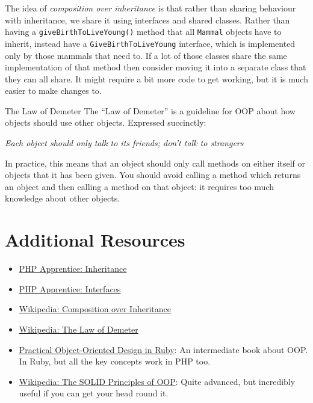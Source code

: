 The idea of \textit{composition over inheritance} is that rather than sharing behaviour with inheritance, we share it using interfaces and shared classes. Rather than having a \texttt{giveBirthToLiveYoung()} method that all \texttt{Mammal} objects have to inherit, instead have a \texttt{GiveBirthToLiveYoung} interface, which is implemented only by those mammals that need to. If a lot of those classes share the same implementation of that method then consider moving it into a separate class that they can all share. It might require a bit more code to get working, but it is much easier to make changes to.

\begin{infobox}{The Law of Demeter}
    The ``Law of Demeter'' is a guideline for OOP about how objects should use other objects. Expressed succinctly:

    \begin{center}
        \textit{Each object should only talk to its friends; don't talk to strangers}
    \end{center}

    In practice, this means that an object should only call methods on either itself or objects that it has been given. You should avoid calling a method which returns an object and then calling a method on that object: it requires too much knowledge about other objects.

\end{infobox}


\section{Additional Resources}

\begin{itemize}[leftmargin=*]
    \item \href{https://phpapprentice.com/classes-inheritance.html}{PHP Apprentice: Inheritance}
    \item \href{https://phpapprentice.com/interfaces.html}{PHP Apprentice: Interfaces}
    \item \href{https://en.wikipedia.org/wiki/Composition\_over\_inheritance}{Wikipedia: Composition over Inheritance}
    \item \href{https://en.wikipedia.org/wiki/Law\_of\_Demeter}{Wikipedia: The Law of Demeter}
    \item \href{https://www.poodr.com}{Practical Object-Oriented Design in Ruby}: An intermediate book about OOP. In Ruby, but all the key concepts work in PHP too.
    \item \href{https://en.wikipedia.org/wiki/SOLID}{Wikipedia: The SOLID Principles of OOP}: Quite advanced, but incredibly useful if you can get your head round it.
\end{itemize}
